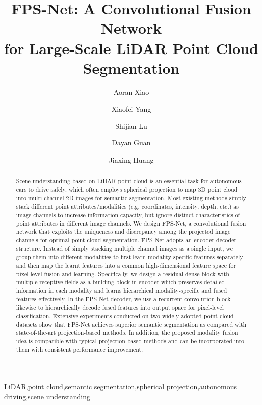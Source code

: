 \documentclass[preprint,review,3p]{elsarticle}
\begin{document}
\begin{frontmatter}

\title{FPS-Net: A Convolutional Fusion Network\\ for Large-Scale LiDAR Point Cloud Segmentation}

\author[1]{Aoran Xiao}

\author[2]{Xiaofei Yang}

\author[1]{Shijian Lu}

\author[1]{Dayan Guan}

\author[1]{Jiaxing Huang}


\address[1]{Nanyang Technological University, 50 Nanyang Avenue, 639798, Singapore}
\address[2]{University of Macau, Avenida da Universidade
Taipa, Macau, 999078, China}




\begin{abstract}
Scene understanding based on LiDAR point cloud is an essential task for autonomous cars to drive safely, which often employs spherical projection to map 3D point cloud into multi-channel 2D images for semantic segmentation.
Most existing methods simply stack different point attributes/modalities (e.g. coordinates, intensity, depth, etc.) as image channels to increase information capacity, but ignore distinct characteristics of point attributes in different image channels. 
We design FPS-Net, a convolutional fusion network 
that exploits the uniqueness and discrepancy among the projected image channels for optimal point cloud segmentation. FPS-Net adopts an encoder-decoder structure. Instead of simply stacking multiple channel images as a single input, we group them into different modalities to first learn modality-specific features separately and then map the learnt features into a common high-dimensional feature space for pixel-level fusion and learning. Specifically, we design a residual dense block with multiple receptive fields as a building block in encoder which preserves detailed information in each modality and learns hierarchical modality-specific and fused features effectively. In the FPS-Net decoder, we use a recurrent convolution block likewise to hierarchically decode fused features into output space for pixel-level classification. Extensive experiments conducted on two widely adopted point cloud datasets show that FPS-Net achieves superior semantic segmentation as compared with state-of-the-art projection-based methods. In addition, the proposed modality fusion idea is compatible with typical projection-based methods and can be incorporated into them with consistent performance improvement.
\end{abstract}

\begin{keyword}
LiDAR\sep point cloud\sep semantic segmentation\sep spherical projection\sep autonomous driving\sep scene understanding
\end{keyword}

\end{frontmatter}
\end{document}
